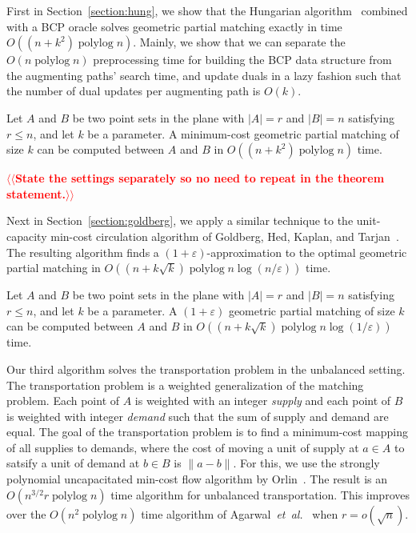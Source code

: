 \documentclass[a4paper,UKenglish]{socg-lipics-v2018}
\makeatletter
\def\note#1{\textcolor{red}{{#1}}}
\def\etal{\emph{et~al.}}
\def\etal{\textit{et~al.}}
\def\polylog{\mathop{\mathrm{polylog}}}
\def\eps{\varepsilon}
\theoremstyle{plain}
\numberwithin{figure}{section}
\def\n@te#1{\textsf{\boldmath \textbf{$\langle\!\langle$#1$\rangle\!\rangle$}}\leavevmode}
\def\note#1{\textcolor{red}{\n@te{#1}}}
\makeatother
\begin{document}
First in Section~\ref{section:hung}, we show that the Hungarian
algorithm~\cite{Kuhn55} combined with a BCP oracle solves geometric partial
matching exactly in time $O((n + k^2)\polylog n)$.
Mainly, we show that we can separate the $O(n\polylog n)$ preprocessing time
for building the BCP data structure from the augmenting paths' search time,
and update duals in a lazy fashion such that the number of dual updates per
augmenting path is $O(k)$.

\begin{theorem}
\label{theorem:hung}
Let $A$ and $B$ be two point sets in the plane with $|A| = r$ and $|B| = n$ satisfying $r \le n$, and let $k$ be a
parameter.  A minimum-cost geometric partial matching of size $k$
can be computed between $A$ and $B$ in $O((n + k^2)\polylog n)$ time.
\end{theorem}

\note{State the settings separately so no need to repeat in the theorem statement.}


Next in Section~\ref{section:goldberg}, we apply a similar technique to the
unit-capacity min-cost circulation algorithm of Goldberg, Hed, Kaplan, and
Tarjan~\cite{GHKT17}.
The resulting algorithm finds a $(1 + \eps)$-approximation to the optimal
geometric partial matching in $O((n + k\sqrt{k})\polylog n \log(n/\eps))$ time.

\begin{theorem}
\label{theorem:gmcm}
Let $A$ and $B$ be two point sets in the plane with $|A| = r$ and $|B| = n$
satisfying $r \le n$, and let $k$ be a parameter.
A $(1+\eps)$ geometric partial matching of size $k$ can be computed between
$A$ and $B$ in $O((n + k\sqrt{k})\polylog n \log(1/\eps))$ time. %
\end{theorem}


Our third algorithm solves the transportation problem in the unbalanced setting.
The transportation problem is a weighted generalization of the matching problem.
Each point of $A$ is weighted with an integer \emph{supply} and each point of
$B$ is weighted with integer \emph{demand} such that the sum of supply and
demand are equal.
The goal of the transportation problem is to find a minimum-cost mapping of
all supplies to demands, where the cost of moving a unit of supply at $a \in A$
to satsify a unit of demand at $b \in B$ is $\|a - b\|$.
For this, we use the strongly polynomial uncapacitated min-cost flow algorithm
by Orlin~\cite{O93}.
The result is an $O(n^{3/2} r \polylog n)$ time algorithm for unbalanced
transportation.
This improves over the $O(n^2 \polylog n)$ time algorithm of
Agarwal~\etal~\cite{AFPVX17} when $r = o(\sqrt{n})$.
\end{document}
